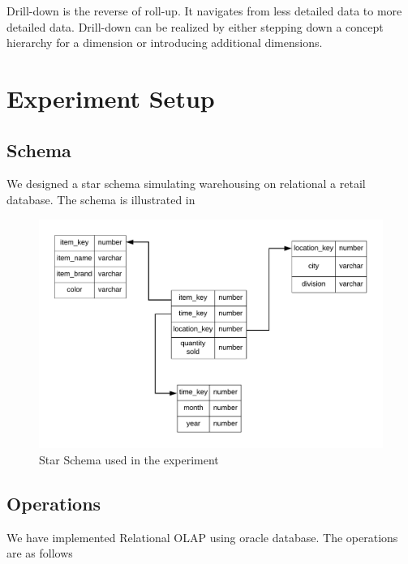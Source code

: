\documentclass[12pt]{article}
\begin{document}
Drill-down is the reverse of roll-up. It navigates from less detailed data to more detailed data. Drill-down can be realized by either stepping down a concept hierarchy for a dimension or introducing additional dimensions.

\section{Experiment Setup}
\subsection{Schema}
We designed a star schema simulating warehousing on relational a retail database. The schema is illustrated in 

\begin{figure}[H]
	\centering
	\includegraphics[]{schema.png}
	\caption{Star Schema used in the experiment}
\end{figure}

\subsection{Operations}
We have implemented Relational OLAP using oracle database. The operations are as follows 
\end{document}
